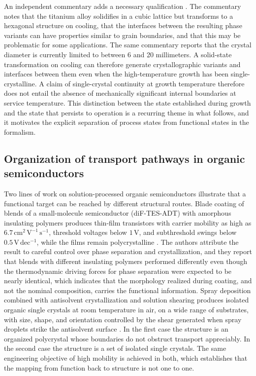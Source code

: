 \documentclass[11pt]{article}
\theoremstyle{definition}
\begin{document}
An independent commentary adds a necessary qualification \cite{rohrer2026}. The commentary notes that the titanium alloy solidifies in a cubic lattice but transforms to a hexagonal structure on cooling, that the interfaces between the resulting phase variants can have properties similar to grain boundaries, and that this may be problematic for some applications. The same commentary reports that the crystal diameter is currently limited to between 6 and 20 millimeters. A solid-state transformation on cooling can therefore generate crystallographic variants and interfaces between them even when the high-temperature growth has been single-crystalline. A claim of single-crystal continuity at growth temperature therefore does not entail the absence of mechanically significant internal boundaries at service temperature. This distinction between the state established during growth and the state that persists to operation is a recurring theme in what follows, and it motivates the explicit separation of process states from functional states in the formalism.

\subsection{Organization of transport pathways in organic semiconductors}

Two lines of work on solution-processed organic semiconductors illustrate that a functional target can be reached by different structural routes. Blade coating of blends of a small-molecule semiconductor (diF-TES-ADT) with amorphous insulating polymers produces thin-film transistors with carrier mobility as high as $6.7\,\mathrm{cm^{2}\,V^{-1}\,s^{-1}}$, threshold voltages below $1\,\mathrm{V}$, and subthreshold swings below $0.5\,\mathrm{V\,dec^{-1}}$, while the films remain polycrystalline \cite{niazi2015}. The authors attribute the result to careful control over phase separation and crystallization, and they report that blends with different insulating polymers performed differently even though the thermodynamic driving forces for phase separation were expected to be nearly identical, which indicates that the morphology realized during coating, and not the nominal composition, carries the functional information. Spray deposition combined with antisolvent crystallization and solution shearing produces isolated organic single crystals at room temperature in air, on a wide range of substrates, with size, shape, and orientation controlled by the shear generated when spray droplets strike the antisolvent surface \cite{rigas2016}. In the first case the structure is an organized polycrystal whose boundaries do not obstruct transport appreciably. In the second case the structure is a set of isolated single crystals. The same engineering objective of high mobility is achieved in both, which establishes that the mapping from function back to structure is not one to one.
\end{document}
